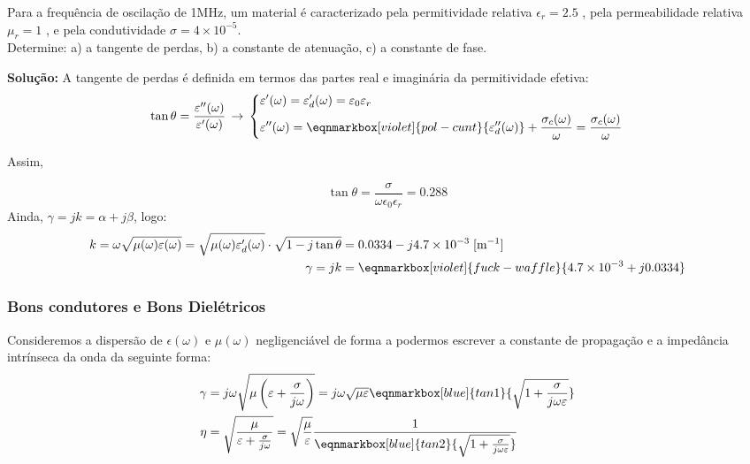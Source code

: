 \begin{question}
    Para a frequência de oscilação de 1MHz, um material é caracterizado pela permitividade relativa $\epsilon_r = 2.5$ , pela permeabilidade relativa $\mu_r = 1$ , e pela condutividade $\sigma = 4 \times 10^{-5}$.\\[3pt]
    Determine: a) a tangente de perdas, b) a constante de atenuação, c) a constante de fase.
    
    \questionSep
    \textbf{Solução:} A tangente de perdas é definida em termos das partes real e imaginária da permitividade efetiva:
    $$
        \tan \theta = \frac{\epsilon''(\omega)}{\epsilon'(\omega)}\,\rightarrow\,
         \left\{
            \begin{aligned}
                &\epsilon'(\omega) =\epsilon_d'(\omega) = \epsilon_0\epsilon_r\\
                 &\epsilon''(\omega) =  \eqnmarkbox[violet]{pol-cunt}{\epsilon''_d(\omega)} + \frac{\sigma_c(\omega)}{\omega} = \frac{\sigma_c(\omega)}{\omega}
            \end{aligned}\right.
    $$

    Assim,

    \vspace{-1.5em}
    $$
        \boxed{\tan \theta = \frac{\sigma}{\omega \epsilon_0 \epsilon_r} = 0.288}
    $$
    Ainda, $\gamma = jk = \alpha + j\beta$, logo:
    $$
        \begin{aligned}
            k = \omega\sqrt{\mu(\omega)\epsilon(\omega)} = \sqrt{\mu(\omega)\epsilon_d'(\omega)}\cdot\sqrt{1 - j\tan \theta} &= 0.0334 - j4.7\times 10^{-3} \; [\text{m}^{-1}]\\
            \gamma = jk &= \eqnmarkbox[violet]{fuck-waffle}{4.7\times 10^{-3} + j0.0334}
        \end{aligned}
    $$
\end{question}
\clearpage
\subsubsection{Bons condutores e Bons Dielétricos}
Consideremos a dispersão de $\epsilon(\omega)$ e $\mu(\omega)$ negligenciável de forma a podermos escrever a constante de propagação e a impedância intrínseca da onda da seguinte forma:
\begin{align}
        \gamma &= j\omega\sqrt{\mu\left(\epsilon + \frac{\sigma}{j\omega}\right)} = j\omega\sqrt{\mu\epsilon}\eqnmarkbox[blue]{tan1}{\sqrt{1+\frac{\sigma}{j\omega\epsilon}}}\label{eq:gamma-nd}\\
        \eta &= \sqrt{\frac{\mu}{\epsilon + \frac{\sigma}{j\omega}}} = \sqrt{\frac{\mu}{\epsilon}}\frac{1}{\eqnmarkbox[blue]{tan2}{\sqrt{1+\frac{\sigma}{j\omega\epsilon}}}}\label{eq:eta}
\end{align}


